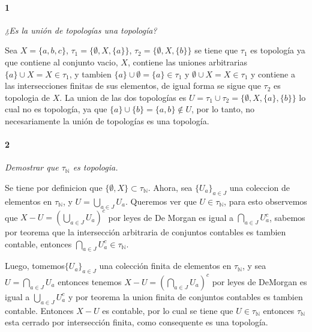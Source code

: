 \documentclass[12pt]{article}
\author{Alumnos: \\Arturo Rodriguez Contreras - 2132880 \\
Jonathan Raymundo Torres Cardenas - 1949731\\
Praxedis Jimenes Ruvalcaba \\
Erick Román Montemayor Treviño - 1957959 \\
Alexis Noe Mora Leyva \\
Everardo Flores Rivera - 2127301}
\begin{document}
\maketitle

\paragraph{1}
\textit{¿Es la unión de topologías una topología?}

Sea $X = \{ a, b, c \}$, $\tau_{1} = \{\emptyset, X, \{a\} \}$, $ \tau_{2} = \{\emptyset, X, \{b\} \}$
se tiene que $\tau_{1}$ es topología ya que contiene al conjunto vacio, $X$, contiene las uniones arbitrarias
$\{a\} \cup X = X \in \tau_{1}$, y tambien
$\{a\} \cup \emptyset = \{a\} \in \tau_{1}$
y $\emptyset \cup X = X \in \tau_{1}$
y contiene a las intersecciones finitas de sus elementos, 
de igual forma se sigue que $\tau_{2}$ es topologia de $X$. La union de las dos topologías es
$U = \tau_{1} \cup \tau_{2} = \{ \emptyset, X, \{a\}, \{b\} \}$
lo cual no es topolog\'ia, ya que $\{a\} \cup \{b\} = \{a, b\} \notin U$, por lo tanto, no
necesariamente la unión de topologías es una topología.\\

\paragraph{2}
\textit{Demostrar que $\tau_{\mathbb{N}}$ es topologia.}

Se tiene por definicion que $\{\emptyset, X\} \subset \tau_{\mathbb{N}}$. Ahora, sea $\{U_{a}\}_{a \in J}$ una coleccion de elementos en $\tau_{\mathbb{N}}$,
y $U = \bigcup_{a \in J} U_{a}$. Queremos ver que $U \in \tau_{\mathbb{N}}$, para
esto observemos que $X - U = (\bigcup_{a \in J} U_{a})^{c} $ por leyes de De Morgan es igual a
$\bigcap_{a \in J} U_{a}^{c}$, sabemos por teorema que la intersecci\'on arbitraria de conjuntos contables es tambien
contable, entonces $\bigcap_{a \in J} U_{a}^{c} \in \tau_{\mathbb{N}}$. 

Luego, tomemos$\{U_{a}\}_{a \in J}$ una colecci\'on finita de elementos en
$\tau_{\mathbb{N}}$, y sea $U = \bigcap_{a \in J}U_{a}$ entonces tenemos $X - U = (\bigcap_{a \in J}U_{a})^{c}$ por leyes de DeMorgan es igual a $\bigcup_{a \in J}U_{a}^{c}$ y por teorema
la union finita de conjuntos contables es tambien
contable. Entonces $X - U$ es contable, por lo cual se tiene que $U \in \tau_{\mathbb{N}}$ entonces $\tau_{\mathbb{N}}$ esta
cerrado por intersecci\'on finita, como consequente es una topolog\'ia.\\
\end{document}
